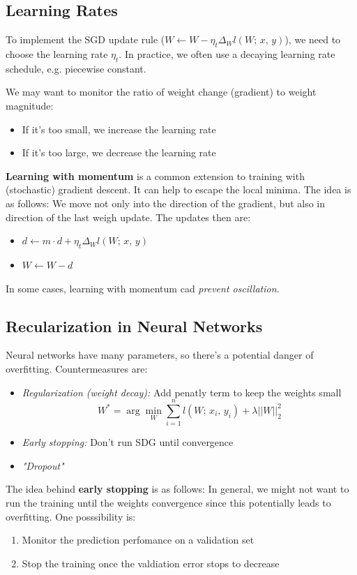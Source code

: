 \documentclass[a4paper]{extarticle}
\begin{document}
\subsection{Learning Rates}

To implement the SGD update rule ($W \leftarrow W - \eta_t\Delta_Wl(W; \, x, \, y)$), we need to choose the learning rate $\eta_t$. In practice, we often use a decaying learning rate schedule, e.g. piecewise constant.

We may want to monitor the ratio of weight change (gradient) to weight magnitude:
\begin{itemize}
    \item If it's too small, we increase the learning rate
    \item If it's too large, we decrease the learning rate
\end{itemize}

\textbf{Learning with momentum} is a common extension to training with (stochastic) gradient descent. It can help to escape the local minima. The idea is as follows: We move not only into the direction of the gradient, but also in direction of the last weigh update. The updates then are:
\begin{itemize}
    \item $d \leftarrow m \cdot d + \eta_t\Delta_Wl(W; \, x, \, y)$
    \item $W \leftarrow W - d$
\end{itemize}
In some cases, learning with momentum cad \textit{prevent oscillation.}

\subsection{Recularization in Neural Networks}

Neural networks have many parameters, so there's a potential danger of overfitting. Countermeasures are:
\begin{itemize}
    \item \textit{Regularization (weight decay):} Add penatly term to keep the weights small
    \[
        W^* = \arg \min_W \sum_{i = 1}^n l(W; \, x_i, \, y_i) + \lambda ||W||_2^2
    \]
    \item \textit{Early stopping:} Don't run SDG until convergence
    \item \textit{"Dropout"}
\end{itemize}

The idea behind \textbf{early stopping} is as follows: In general, we might not want to run the training until the weights convergence since this potentially leads to overfitting. One posssibility is:
\begin{enumerate}
    \item Monitor the prediction perfomance on a validation set
    \item Stop the training once the valdiation error stops to decrease
\end{enumerate}
\end{document}
